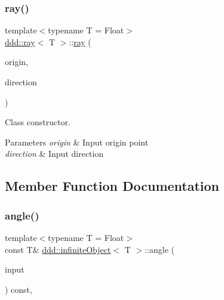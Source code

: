 \subsubsection{\texorpdfstring{ray()}{ray()}}
{\footnotesize\ttfamily template$<$typename T = Float$>$ \\
\hyperlink{classddd_1_1ray}{ddd\+::ray}$<$ T $>$\+::\hyperlink{classddd_1_1ray}{ray} (\begin{DoxyParamCaption}\item[{const \hyperlink{classddd_1_1point}{point}$<$ T $>$ \&}]{origin,  }\item[{const \hyperlink{classddd_1_1vector}{vector}$<$ T $>$ \&}]{direction }\end{DoxyParamCaption})\hspace{0.3cm}{\ttfamily [inline]}}



Class constructor. 


\begin{DoxyParams}{Parameters}
{\em origin} & Input origin point \\
\hline
{\em direction} & Input direction \\
\hline
\end{DoxyParams}


\subsection{Member Function Documentation}
\mbox{\label{classddd_1_1infinite_object_a2145eca21c4505c11d19badc25faaf85}} 
\subsubsection{\texorpdfstring{angle()}{angle()}}
{\footnotesize\ttfamily template$<$typename T = Float$>$ \\
const T\& \hyperlink{classddd_1_1infinite_object}{ddd\+::infinite\+Object}$<$ T $>$\+::angle (\begin{DoxyParamCaption}\item[{const \hyperlink{classddd_1_1infinite_object}{infinite\+Object}$<$ T $>$ \&}]{input }\end{DoxyParamCaption}) const\hspace{0.3cm}{\ttfamily [inline]}, {\ttfamily [inherited]}}



